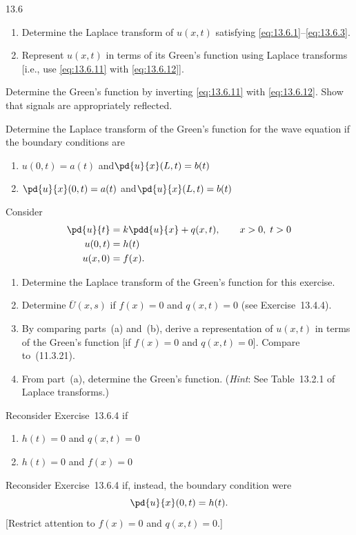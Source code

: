 \begin{exercises}{13.6}

\item
\begin{enumerate}
\item[(a)] Determine the Laplace transform of $u(x,t)$ satisfying \eqref{eq:13.6.1}--\eqref{eq:13.6.3}.
\item[(b)] Represent $u(x,t)$ in terms of its Green's function using Laplace transforms [i.e., use \eqref{eq:13.6.11} with \eqref{eq:13.6.12}].
\end{enumerate}

\item Determine the Green's function by inverting \eqref{eq:13.6.11} with \eqref{eq:13.6.12}.  Show that signals are appropriately reflected.

\item Determine the Laplace transform of the Green's function for the wave equation if the boundary conditions are
\begin{enumerate}
\item[(a)] $u(0,t) = a(t)$ \quad and\quad $\pd{u}{x}(L,t) = b(t)$
\item[(b)] $\pd{u}{x}(0,t) = a(t)$ \quad and\quad $\pd{u}{x}(L,t) = b(t)$
\end{enumerate}

\item Consider
\begin{align*}
\pd{u}{t} &= k\pdd{u}{x} + q(x,t), \qquad x > 0,\; t > 0 \\
u(0,t) &= h(t) \\
u(x,0) &= f(x).
\end{align*}
\begin{enumerate}
\item[\starred(a)] Determine the Laplace transform of the Green's function for this exercise.
\item[(b)] Determine $\overline{U}(x,s)$ if $f(x) = 0$ and $q(x,t) = 0$ (see Exercise~13.4.4).
\item[(c)] By comparing parts~(a) and~(b), derive a representation of $u(x,t)$ in terms of the Green's function [if $f(x) = 0$ and $q(x,t) = 0$].  Compare to~(11.3.21).
\item[(d)] From part~(a), determine the Green's function.  (\emph{Hint}: See Table~13.2.1 of Laplace transforms.)
\end{enumerate}

\item Reconsider Exercise~13.6.4 if
\begin{enumerate}
\item[(a)] $h(t) = 0$ and $q(x,t) = 0$
\item[(b)] $h(t) = 0$ and $f(x) = 0$
\end{enumerate}

\item Reconsider Exercise~13.6.4 if, instead, the boundary condition were
\[
\pd{u}{x}(0,t) = h(t).
\]
[Restrict attention to $f(x) = 0$ and $q(x,t) = 0$.]

\end{exercises}
